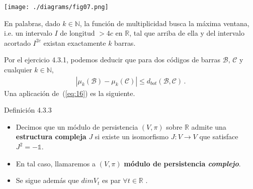 \documentclass{beamer}
\newcounter{Ejercicio}
\begin{document}
\begin{frame}
\begin{center}
\texttt{[image: ./diagrams/fig07.png]}
\end{center}
En palabras, dado $k\in \mathbb{N}$, la funci\'on de multiplicidad busca la m\'axima ventana, i.e. un intervalo $I$ de longitud $>4c$ en $\mathbb{R}$, tal que arriba de ella y del intervalo acortado $I^{2c}$ existan exactamente $k$ barras.
\end{frame}

\begin{frame}
\begin{minipage}{0.25\textwidth}

\end{minipage}\hfill{}
$\,$\\
Por el ejercicio 4.3.1, podemos deducir que para dos c\'odigos de barras $\mathcal{B},\,\mathcal{C}$ y cualquier $k\in \mathbb{N}$,
\begin{gather} \tag{16}\label{eq:16}
|\mu_k(\mathcal{B})-\mu_k(\mathcal{C})|\leq d_{bot}(\mathcal{B},\mathcal{C})\,.
\end{gather}
$\,$\\
Una aplicaci\'on de~(\ref{eq:16}) es la siguiente.
\end{frame}

\begin{frame}
\begin{block}{Definici\'on 4.3.3}
\begin{itemize}
\item Decimos que un m\'odulo de persistencia $(V,\pi)$ sobre $\mathbb{R}$ admite una {\bfseries estructura compleja} $J$ si existe un isomorfismo $J:V\rightarrow V$ que satisface $J^2=-\mathbb{1}$.

\item En tal caso, llamaremos a $(V,\pi)$ {\bfseries m\'odulo de persistencia \emph{complejo}}. \\

\item Se sigue adem\'as que $dim V_t$ es par $\forall t\in\mathbb{R}$ .
\end{itemize}
\end{block}
\end{frame}
\end{document}
